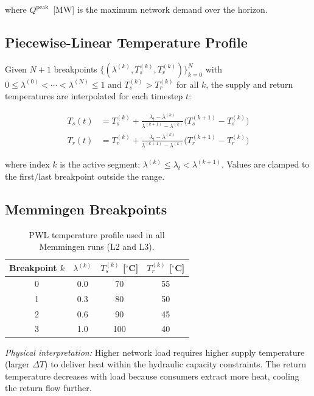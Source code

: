 \documentclass[a4paper,12pt]{article}
\begin{document}
where $Q^{\text{peak}}$~[MW] is the maximum network demand over the horizon.

\subsection{Piecewise-Linear Temperature Profile}

Given $N+1$ breakpoints
$\{(\lambda^{(k)}, T^{(k)}_s, T^{(k)}_r)\}_{k=0}^{N}$
with $0 \leq \lambda^{(0)} < \cdots < \lambda^{(N)} \leq 1$
and $T^{(k)}_s > T^{(k)}_r$ for all $k$, the supply and return temperatures
are interpolated for each timestep $t$:

\begin{align}
  T_s(t) &= T^{(k)}_s
             + \frac{\lambda_t - \lambda^{(k)}}{\lambda^{(k+1)} - \lambda^{(k)}}
               \bigl(T^{(k+1)}_s - T^{(k)}_s\bigr)
  \tag{PWL-2a}
  \label{eq:pwl2a} \\
  T_r(t) &= T^{(k)}_r
             + \frac{\lambda_t - \lambda^{(k)}}{\lambda^{(k+1)} - \lambda^{(k)}}
               \bigl(T^{(k+1)}_r - T^{(k)}_r\bigr)
  \tag{PWL-2b}
  \label{eq:pwl2b}
\end{align}

where index $k$ is the active segment: $\lambda^{(k)} \leq \lambda_t < \lambda^{(k+1)}$.
Values are clamped to the first/last breakpoint outside the range.

\subsection{Memmingen Breakpoints}

\begin{table}[h!]
  \centering
  \caption{PWL temperature profile used in all Memmingen runs (L2 and L3).}
  \begin{tabular}{@{}cccc@{}}
    \toprule
    Breakpoint $k$ & $\lambda^{(k)}$ & $T^{(k)}_s$ [$^{\circ}$C] & $T^{(k)}_r$ [$^{\circ}$C] \\
    \midrule
    0 & 0.0 & 70 & 55 \\
    1 & 0.3 & 80 & 50 \\
    2 & 0.6 & 90 & 45 \\
    3 & 1.0 & 100 & 40 \\
    \bottomrule
  \end{tabular}
  \label{tab:pwl-breakpoints}
\end{table}

\noindent\textit{Physical interpretation:} Higher network load requires higher supply
temperature (larger $\Delta T$) to deliver heat within the hydraulic capacity constraints.
The return temperature decreases with load because consumers extract more heat, cooling
the return flow further.
\end{document}
